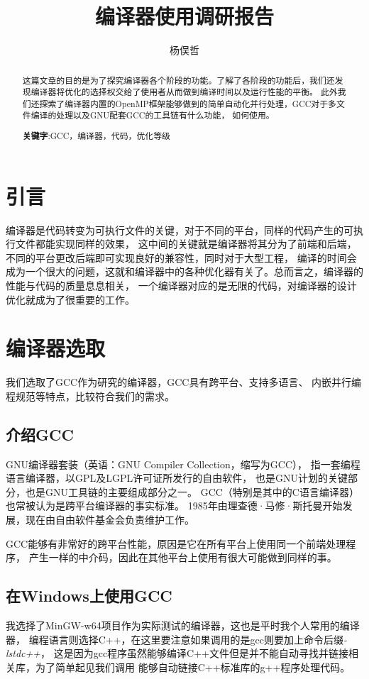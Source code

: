 \documentclass[UTF8]{ctexart}
\begin{document}
    \title{编译器使用调研报告}
    \author{杨俣哲}
    \maketitle
    \begin{abstract}
    这篇文章的目的是为了探究编译器各个阶段的功能。了解了各阶段的功能后，我们还发现编译器将优化的选择权交给了使用者从而做到编译时间以及运行性能的平衡。
    此外我们还探索了编译器内置的OpenMP框架能够做到的简单自动化并行处理，GCC对于多文件编译的处理以及GNU配套GCC的工具链有什么功能，
    如何使用。
    
    \centering
    \textbf{关键字}:GCC，编译器，代码，优化等级
    \end{abstract}
    \newpage
    \tableofcontents
    \newpage
    \section{引言}
    编译器是代码转变为可执行文件的关键，对于不同的平台，同样的代码产生的可执行文件都能实现同样的效果，
    这中间的关键就是编译器将其分为了前端和后端，不同的平台更改后端即可实现良好的兼容性，同时对于大型工程，
    编译的时间会成为一个很大的问题，这就和编译器中的各种优化器有关了。总而言之，编译器的性能与代码的质量息息相关，
    一个编译器对应的是无限的代码，对编译器的设计优化就成为了很重要的工作。
    \section{编译器选取}
    我们选取了GCC作为研究的编译器，GCC具有跨平台、支持多语言、
    内嵌并行编程规范等特点，比较符合我们的需求。
    \subsection{介绍GCC}
    GNU编译器套装（英语：GNU Compiler Collection，缩写为GCC），
    指一套编程语言编译器，以GPL及LGPL许可证所发行的自由软件，
    也是GNU计划的关键部分，也是GNU工具链的主要组成部分之一。
    GCC（特别是其中的C语言编译器）也常被认为是跨平台编译器的事实标准。
    1985年由理查德·马修·斯托曼开始发展，现在由自由软件基金会负责维护工作。\cite{GCCWiki}

    GCC能够有非常好的跨平台性能，原因是它在所有平台上使用同一个前端处理程序，
    产生一样的中介码，因此在其他平台上使用有很大可能做到同样的事。
    \subsection{在Windows上使用GCC}
    我选择了MinGW-w64项目作为实际测试的编译器，这也是平时我个人常用的编译器，
    编程语言则选择C++，在这里要注意如果调用的是gcc则要加上命令后缀\emph{-lstdc++}，
    这是因为gcc程序虽然能够编译C++文件但是并不能自动寻找并链接相关库，为了简单起见我们调用
    能够自动链接C++标准库的g++程序处理代码。
\end{document}
